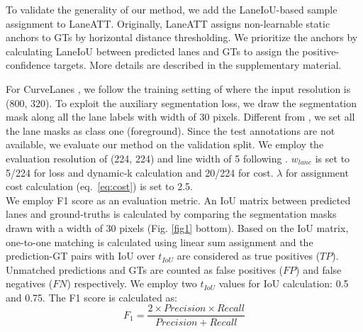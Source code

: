 \documentclass[10pt,twocolumn,letterpaper]{article}
\begin{document}
To validate the generality of our method, we add the LaneIoU-based sample assignment to LaneATT\cite{tabelini2021cvpr}.
Originally, LaneATT assigns non-learnable static anchors to GTs by horizontal distance thresholding.
We prioritize the anchors by calculating LaneIoU between predicted lanes and GTs to assign the positive-confidence targets.
More details are described in the supplementary material.

For CurveLanes \cite{CurveLane-NAS}, we follow the training setting of \cite{Liu_2021_ICCV} where the input resolution is (800, 320). To exploit the auxiliary segmentation loss, we draw the segmentation mask along all the lane labels with width of 30 pixels. Different from \cite{pan2018SCNN}, we set all the lane masks as class one (foreground). Since the test annotations are not available, we evaluate our method on the validation split. We employ the evaluation resolution of (224, 224) and line width of 5 following \cite{Liu_2021_ICCV}. $w_{lane}$ is set to 5/224 for loss and dynamic-k calculation and 20/224 for cost. $\lambda$ for assignment cost calculation (eq. \ref{eq:cost}) is set to 2.5. \\
We employ F1 score \cite{pan2018SCNN} as an evaluation metric.
An IoU matrix between predicted lanes and ground-truths is calculated by comparing the segmentation masks drawn with a width of 30 pixels (Fig. \ref{fig1} bottom).
Based on the IoU matrix, one-to-one matching is calculated using linear sum assignment and the prediction-GT pairs with IoU over $t_{IoU}$ are considered as true positives ($TP$). Unmatched predictions and GTs are counted as false positives ($FP$) and false negatives ($FN$) respectively.
We employ two $t_{IoU}$ values for IoU calculation: 0.5 and 0.75. The F1 score is calculated as:
\begin{equation}
\label{F1score}
F_1=\frac{2\times Precision \times Recall}{Precision+Recall}
\end{equation}
\end{document}

